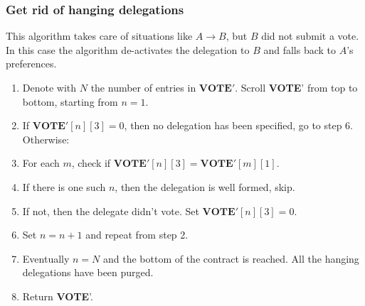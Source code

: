 \documentclass[submission, copyright,creativecommons,sharealike,noncommercial]{eptcs}
\newcommand{\Vote}{\textbf{VOTE}\xspace}
\begin{document}
\subsubsection{Get rid of hanging delegations}\label{subsubsec:Get rid of hanging delegations}
	This algorithm takes care of situations like $A \to B$, but $B$ did not submit a vote. In this case the algorithm de-activates the delegation to $B$ and falls back to $A$'s preferences.
	\begin{enumerate}
		\item Denote with $N$ the number of entries in $\Vote'$. Scroll \Vote' from top to bottom, starting from $n=1$.
		\item If $\Vote'[n][3]=0$, then no delegation has been specified, go to step 6. Otherwise:
		\item For each $m$, check if $\Vote'[n][3] = \Vote'[m][1]$.
		\item If there is one such $n$, then the delegation is well formed, skip.
		\item If not, then the delegate didn't vote. Set $\Vote'[n][3] = 0$.
		\item Set $n=n+1$ and repeat from step 2.
		\item Eventually $n = N$ and the bottom of the contract is reached. All the hanging delegations have been purged.
		\item Return \Vote'.
	\end{enumerate}

	
\end{document}

